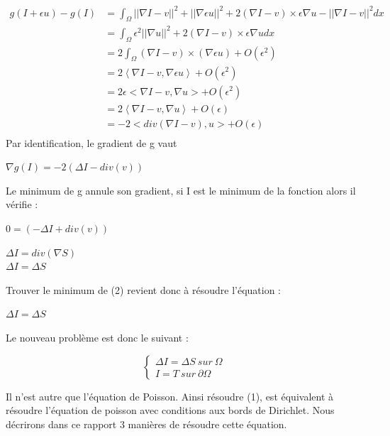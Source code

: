 \begin{equation*} 
\left.
\begin{aligned}
    g(I+\epsilon u) -g(I) &=  \int_\Omega || \nabla I - v||^2+ ||\nabla \epsilon u||^2 +2(\nabla I - v)\times \epsilon \nabla u  - ||\nabla I -v ||^2 dx\\
  &=  \int_\Omega \epsilon ^2||\nabla u||^2 +2(\nabla I - v)\times \epsilon \nabla u dx\\
    & = 2\int_\Omega (\nabla I - v) \times (\nabla \epsilon u ) + O (\epsilon^2) \\ 
    & = 2\left<\nabla I - v, \nabla \epsilon u \right> + O (\epsilon^2) \\ 
      &  =   2\epsilon<\nabla I - v,  \nabla u> + O (\epsilon^2) \\ 
         &  = 2\left<\nabla I - v,  \nabla u \right> + O (\epsilon)\\ 
    & =  -2 <div(\nabla I - v), u > + O (\epsilon)\\
\end{aligned}
\right.
\end{equation*}
Par identification, le gradient de g vaut 
\begin{center}
		$\nabla g(I) = -2(\Delta I-div( v))$
\end{center} 
Le minimum de g annule son gradient, si I est le minimum de la fonction alors il vérifie :\begin{center}
		$0= (-\Delta I+div(v))$
\end{center}
\begin{center}
		$\Delta I =div(\nabla S)$\\
		$\Delta I = \Delta S$
		
\end{center} 

Trouver le minimum de (2) revient donc à résoudre l'équation : 
\begin{center}
$\Delta I = \Delta S$
\end{center}
Le nouveau problème est donc le suivant : 
\begin{center}
    \begin{equation*}
        \left\{
        \begin{aligned}
         \Delta I = \Delta S  \ sur \  \Omega \\
          I = T \ sur \  \partial \Omega
        \end{aligned}
        \right.
    \end{equation*}
\end{center}
Il n'est autre que l'équation de Poisson. Ainsi résoudre (1), est équivalent à résoudre l'équation de poisson avec conditions aux bords de Dirichlet. Nous décrirons dans ce rapport 3 manières de résoudre cette équation. 

